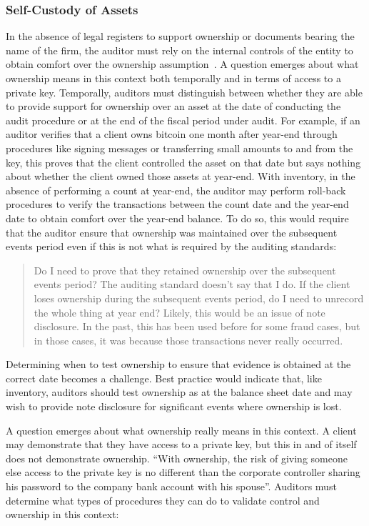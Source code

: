 \subsubsection{Self-Custody of Assets}
In the absence of legal registers to support ownership or documents bearing the name of the firm, the auditor must rely on the internal controls of the entity to obtain comfort over the ownership assumption~\cite{pimentel2021systemizing}. A question emerges about what ownership means in this context both temporally and in terms of access to a private key. Temporally, auditors must distinguish between whether they are able to provide support for ownership over an asset at the date of conducting the audit procedure or at the end of the fiscal period under audit. For example, if an auditor verifies that a client owns bitcoin one month after year-end through procedures like signing messages or transferring small amounts to and from the key, this proves that the client controlled the asset on that date but says nothing about whether the client owned those assets at year-end. With inventory, in the absence of performing a count at year-end, the auditor may perform roll-back procedures to verify the transactions between the count date and the year-end date to obtain comfort over the year-end balance. To do so, this would require that the auditor ensure that ownership was maintained over the subsequent events period even if this is not what is required by the auditing standards: 

\begin{quote}
Do I need to prove that they retained ownership over the subsequent events period? The auditing standard doesn't say that I do. If the client loses ownership during the subsequent events period, do I need to unrecord the whole thing at year end? Likely, this would be an issue of note disclosure. In the past, this has been used before for some fraud cases, but in those cases, it was because those transactions never really occurred.
\end{quote}

Determining when to test ownership to ensure that evidence is obtained at the correct date becomes a challenge. Best practice would indicate that, like inventory, auditors should test ownership as at the balance sheet date and may wish to provide note disclosure for significant events where ownership is lost. 

A question emerges about what ownership really means in this context. A client may demonstrate that they have access to a private key, but this in and of itself does not demonstrate ownership. ``With ownership, the risk of giving someone else access to the private key is no different than the corporate controller sharing his password to the company bank account with his spouse''. Auditors must determine what types of procedures they can do to validate control and ownership in this context: 

